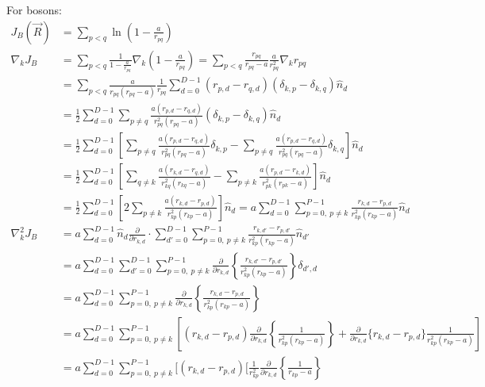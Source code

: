 \documentclass[12pt]{article}
\begin{document}
\noindent For bosons:
\begin{align*}
J_B(\vec{R}) &= \sum_{p<q} \ln \left( 1-\frac{a}{r_{pq}} \right)\\
\nabla_k  J_B  &= \sum_{p<q} \frac{1}{1-\frac{a}{r_{pq}}} \nabla_{k} \left( 1-\frac{a}{r_{pq}} \right) 
= \sum_{p<q} \frac{r_{pq}}{r_{pq}-a} \frac{a}{r_{pq}^2} \nabla_k r_{pq} \\
&= \sum_{p<q} \frac{a}{r_{pq}(r_{pq}-a)} \frac{1}{r_{pq}} \sum_{d=0}^{D-1} (r_{p,d}-r_{q,d}) (\delta_{k,p}-\delta_{k,q}) \hat{n}_{d} \\
&=\frac{1}{2} \sum_{d=0}^{D-1} \sum_{p\neq q} \frac{a (r_{p,d}-r_{q,d})}{r_{pq}^2(r_{pq}-a)} (\delta_{k,p}-\delta_{k,q}) \hat{n}_{d} \\
&=\frac{1}{2} \sum_{d=0}^{D-1} \left[  \sum_{p\neq q} \frac{a (r_{p,d}-r_{q,d})}{r_{pq}^2(r_{pq}-a)} \delta_{k,p} - \sum_{p\neq q} \frac{a (r_{p,d}-r_{q,d})}{r_{pq}^2(r_{pq}-a)} \delta_{k,q} \right] \hat{n}_{d} \\
&=\frac{1}{2} \sum_{d=0}^{D-1} \left[  \sum_{q\neq k} \frac{a (r_{k,d}-r_{q,d})}{r_{kq}^2(r_{kq}-a)}  - \sum_{p\neq k} \frac{a (r_{p,d}-r_{k,d})}{r_{pk}^2(r_{pk}-a)} \right] \hat{n}_{d} \\
&=\frac{1}{2} \sum_{d=0}^{D-1} \left[ 2  \sum_{p\neq k} \frac{a (r_{k,d}-r_{p,d})}{r_{kp}^2(r_{kp}-a)} \right] \hat{n}_{d} =  a \sum_{d=0}^{D-1}  \sum_{p=0, \ p\neq k}^{P-1} \frac{r_{k,d}-r_{p,d}}{r_{kp}^2(r_{kp}-a)}  \hat{n}_{d} \\
\nabla_k^2 J_B &= a \sum_{d=0}^{D-1} \hat{n}_d \frac{\partial}{\partial r_{k,d}} \cdot \sum_{d'=0}^{D-1}  \sum_{p=0, \ p\neq k}^{P-1} \frac{r_{k,d'}-r_{p,d'}}{r_{kp}^2(r_{kp}-a)}  \hat{n}_{d'} \\
&= a \sum_{d=0}^{D-1} \sum_{d'=0}^{D-1}  \sum_{p=0, \ p\neq k}^{P-1} \frac{\partial}{\partial r_{k,d}} \left\{  \frac{r_{k,d'}-r_{p,d'}}{r_{kp}^2(r_{kp}-a)} \right\} \delta_{d',d} \\
&= a \sum_{d=0}^{D-1} \sum_{p=0, \ p\neq k}^{P-1} \frac{\partial}{\partial r_{k,d}} \left\{  \frac{r_{k,d}-r_{p,d}}{r_{kp}^2(r_{kp}-a)} \right\} \\
&= a \sum_{d=0}^{D-1} \sum_{p=0, \ p\neq k}^{P-1} \left[ 
(r_{k,d}-r_{p,d}) \frac{\partial}{\partial r_{k,d}} \left\{ \frac{1}{r_{kp}^2(r_{kp}-a)} \right\} + \frac{\partial}{\partial r_{k,d}} \big\{ r_{k,d}-r_{p,d} \big\} \frac{1}{r_{kp}^2(r_{kp}-a)}
\right] \\
&= a \sum_{d=0}^{D-1} \sum_{p=0, \ p\neq k}^{P-1} \Bigg[ 
(r_{k,d}-r_{p,d}) 
\bigg[ 
\frac{1}{r_{kp}^2} \frac{\partial}{\partial r_{k,d}}  \left\{ \frac{1}{r_{kp}-a} \right\}

\end{align*}
\end{document}
